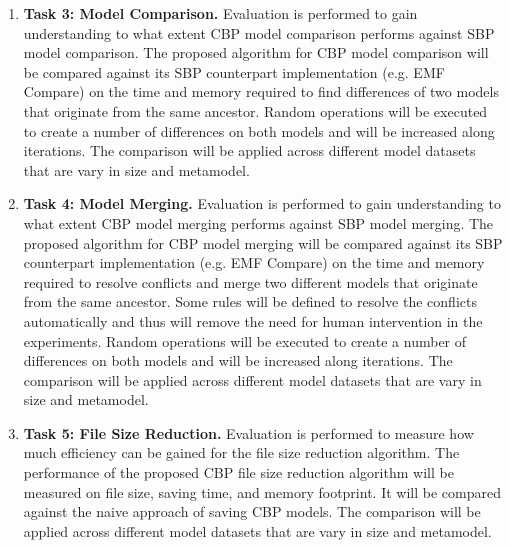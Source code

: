 \documentclass[12pt, a4paper]{report} \usepackage[titletoc]{appendix}
\begin{document}
\begin{enumerate}
	\item \textbf{Task 3: Model Comparison.} Evaluation is performed to gain understanding to what extent CBP model comparison performs against SBP model comparison. The proposed algorithm for CBP model comparison will be compared against its SBP counterpart implementation (e.g. EMF Compare) on the time and memory required to find differences of two models that originate from the same ancestor. Random operations will be executed to create a number of differences on both models and will be increased along iterations. The comparison will be applied across different model datasets that are vary in size and metamodel.   
	
	\item \textbf{Task 4: Model Merging.} Evaluation is performed to gain understanding to what extent CBP model merging performs against SBP model merging. The proposed algorithm for CBP model merging will be compared against its SBP counterpart implementation (e.g. EMF Compare) on the time and memory required to resolve conflicts and merge two different models that originate from the same ancestor. Some rules will be defined to resolve the conflicts automatically and thus will remove the need for human intervention in the experiments. Random operations will be executed to create a number of differences on both models and will be increased along iterations. The comparison will be applied across different model datasets that are vary in size and metamodel.   
	
	\item \textbf{Task 5: File Size Reduction.} Evaluation is performed to measure how much efficiency can be gained for the file size reduction algorithm. The performance of the proposed CBP file size reduction algorithm will be measured on file size, saving time, and memory footprint. It will be compared against the naive approach of saving CBP models. The comparison will be applied across different model datasets that are vary in size and metamodel.   
\end{enumerate}
\end{document}
